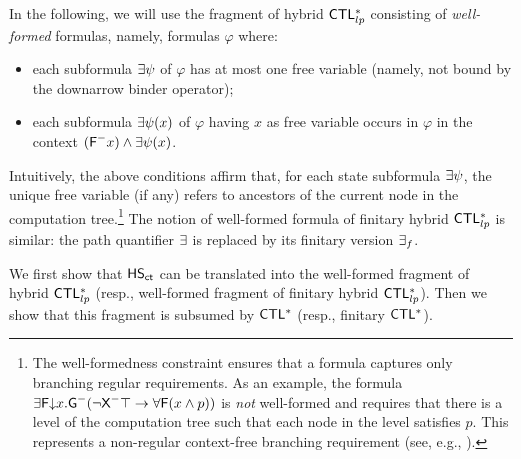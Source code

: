 In the following, we will use the fragment of hybrid $\text{\sffamily CTL$^{*}_{lp}$}$ consisting of \emph{well-formed} formulas,
namely, formulas $\varphi$ where:
 \begin{itemize}
   \item each subformula $\exists \psi$   of $\varphi$ has at most one free variable (namely, not bound by the downarrow binder operator); 
	\item each  subformula $\exists \psi(x)$ of $\varphi$ having $x$ as free variable occurs in $\varphi$ in the context $(\textsf{F}^{-} x) \wedge \exists\psi(x)$.
\end{itemize}
%
Intuitively, the above conditions affirm that, for each state subformula  $\exists \psi$, the unique free variable (if any) refers to ancestors of the current node in the computation tree.\footnote{The well-formedness constraint ensures that a formula captures only branching regular requirements. As an example,
the formula $\exists\textsf{F}\text{$\downarrow$$x$}.\textsf{G}^{-}(\neg \textsf{X}^{-} \top \rightarrow \forall \textsf{F}(x\wedge p))$ is \emph{not} well-formed and requires that there is a level of the computation tree such that each node in the level satisfies $p$. This represents a non-regular context-free branching requirement (see, e.g., \cite{AlurCZ06}).} 
%
The notion of well-formed formula of finitary hybrid $\text{\sffamily CTL$^{*}_{lp}$}$ is similar: the path quantifier $\exists$ is replaced by its finitary version $\exists_f$.

 We first show that
 $\text{\sffamily HS}_{\mathsf{ct}}$ can be translated into the well-formed fragment of hybrid $\text{\sffamily CTL$^{*}_{lp}$}$ (resp., well-formed fragment of finitary hybrid $\text{\sffamily CTL$^{*}_{lp}$}$). Then we show that this fragment is subsumed by $\text{\sffamily CTL$^{*}$}$ (resp., finitary $\text{\sffamily CTL$^{*}$}$).

